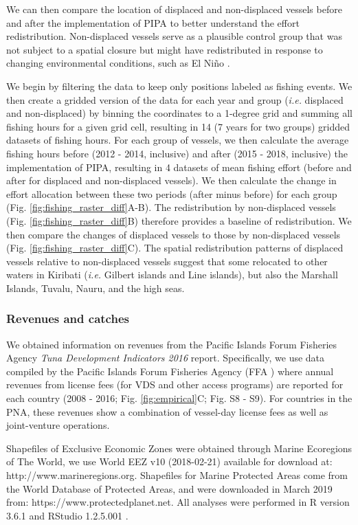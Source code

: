 \documentclass[12pt]{article}
\begin{document}
We can then compare the location of displaced and non-displaced vessels before and after the implementation of PIPA to better understand the effort redistribution. Non-displaced vessels serve as a plausible control group that was not subject to a spatial closure but might have redistributed in response to changing environmental conditions, such as El Ni\~no \cite{hanich2018unraveling,aqorau_2018}.

We begin by filtering the data to keep only positions labeled as fishing events. We then create a gridded version of the data for each year and group (\emph{i.e.} displaced and non-displaced) by binning the coordinates to a 1-degree grid and summing all fishing hours for a given grid cell, resulting in 14 (7 years for two groups) gridded datasets of fishing hours. For each group of vessels, we then calculate the average fishing hours before (2012 - 2014, inclusive) and after (2015 - 2018, inclusive) the implementation of PIPA, resulting in 4 datasets of mean fishing effort (before and after for displaced and non-displaced vessels). We then calculate the change in effort allocation between these two periods (after minus before) for each group (Fig. \ref{fig:fishing_raster_diff}A-B). The redistribution by non-displaced vessels (Fig. \ref{fig:fishing_raster_diff}B) therefore provides a baseline of redistribution. We then compare the changes of displaced vessels to those by non-displaced vessels (Fig. \ref{fig:fishing_raster_diff}C). The spatial redistribution patterns of displaced vessels relative to non-displaced vessels suggest that some relocated to other waters in Kiribati (\emph{i.e.} Gilbert islands and Line islands), but also the Marshall Islands, Tuvalu, Nauru, and the high seas.

\subsubsection{Revenues and catches}

We obtained information on revenues from the Pacific Islands Forum Fisheries Agency \emph{Tuna Development Indicators 2016} report.  Specifically, we use data compiled by the Pacific Islands Forum Fisheries Agency (FFA \cite{ffa_2017}) where annual revenues from license fees (for VDS and other access programs) are reported for each country (2008 - 2016; Fig. \ref{fig:empirical}C; Fig. S8 - S9). For countries in the PNA, these revenues show a combination of vessel-day license fees as well as joint-venture operations.

Shapefiles of Exclusive Economic Zones were obtained through Marine Ecoregions of The World, we use World EEZ v10 (2018-02-21) available for download at: http://www.marineregions.org. Shapefiles for Marine Protected Areas come from the World Database of Protected Areas, and were downloaded in March 2019 from: https://www.protectedplanet.net. All analyses were performed in R version 3.6.1 and RStudio 1.2.5.001 \cite{rcore_2019}.
\end{document}

